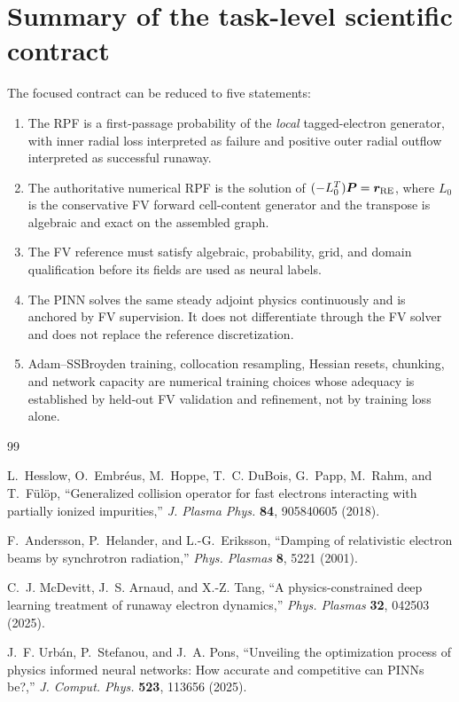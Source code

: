 \documentclass[11pt]{article}
\newcommand{\Pvec}{\bm P}
\newcommand{\rRE}{\bm r_{\rm RE}}
\begin{document}
\section{Summary of the task-level scientific contract}

The focused contract can be reduced to five statements:
\begin{enumerate}[leftmargin=2.3em]
 \item The RPF is a first-passage probability of the \emph{local} tagged-electron
       generator, with inner radial loss interpreted as failure and positive outer radial
       outflow interpreted as successful runaway.
 \item The authoritative numerical RPF is the solution of
       $(-L_0^T)\Pvec=\rRE$, where $L_0$ is the conservative FV forward cell-content
       generator and the transpose is algebraic and exact on the assembled graph.
 \item The FV reference must satisfy algebraic, probability, grid, and domain
       qualification before its fields are used as neural labels.
 \item The PINN solves the same steady adjoint physics continuously and is anchored by FV
       supervision.  It does not differentiate through the FV solver and does not replace
       the reference discretization.
 \item Adam--SSBroyden training, collocation resampling, Hessian resets, chunking, and
       network capacity are numerical training choices whose adequacy is established by
       held-out FV validation and refinement, not by training loss alone.
\end{enumerate}

\footnotesize
\begin{thebibliography}{99}

L.~Hesslow, O.~Embr\'eus, M.~Hoppe, T.~C. DuBois, G.~Papp,
M.~Rahm, and T.~F{\"u}l{\"o}p,
``Generalized collision operator for fast electrons interacting with partially ionized impurities,''
\emph{J. Plasma Phys.} \textbf{84}, 905840605 (2018).

F.~Andersson, P.~Helander, and L.-G.~Eriksson,
``Damping of relativistic electron beams by synchrotron radiation,''
\emph{Phys. Plasmas} \textbf{8}, 5221 (2001).

C.~J. McDevitt, J.~S. Arnaud, and X.-Z. Tang,
``A physics-constrained deep learning treatment of runaway electron dynamics,''
\emph{Phys. Plasmas} \textbf{32}, 042503 (2025).

J.~F. Urb{\'a}n, P.~Stefanou, and J.~A. Pons,
``Unveiling the optimization process of physics informed neural networks: How accurate and competitive can PINNs be?,''
\emph{J. Comput. Phys.} \textbf{523}, 113656 (2025).

\end{thebibliography}
\end{document}
